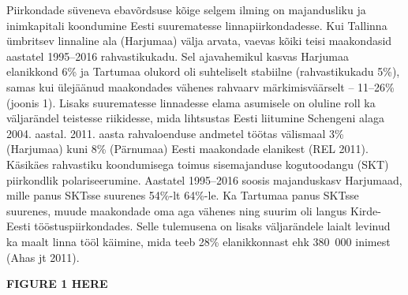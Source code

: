 \documentclass[]{book}
\begin{document}
Piirkondade süveneva ebavõrdsuse kõige selgem ilming on majandusliku ja inimkapitali koondumine Eesti
suurematesse linnapiirkondadesse. Kui Tallinna ümbritsev linnaline ala (Harjumaa) välja arvata, vaevas kõiki
teisi maakondasid aastatel 1995--2016 rahvastikukadu. Sel ajavahemikul kasvas Harjumaa elanikkond 6\% ja
Tartumaa olukord oli suhteliselt stabiilne (rahvastikukadu 5\%), samas kui ülejäänud maakondades vähenes
rahvaarv märkimisväärselt -- 11--26\% (joonis 1). Lisaks suurematesse linnadesse elama asumisele on oluline
roll ka väljarändel teistesse riikidesse, mida lihtsustas Eesti liitumine Schengeni alaga 2004. aastal. 2011.
aasta rahvaloenduse andmetel töötas välismaal 3\% (Harjumaa) kuni 8\% (Pärnumaa) Eesti maakondade
elanikest (REL 2011). Käsikäes rahvastiku koondumisega toimus sisemajanduse kogutoodangu (SKT)
piirkondlik polariseerumine. Aastatel 1995--2016 soosis majanduskasv Harjumaad, mille panus SKTsse
suurenes 54\%-lt 64\%-le. Ka Tartumaa panus SKTsse suurenes, muude maakondade oma aga vähenes ning
suurim oli langus Kirde-Eesti tööstuspiirkondades. Selle tulemusena on lisaks väljarändele laialt levinud ka
maalt linna tööl käimine, mida teeb 28\% elanikkonnast ehk 380~000 inimest (Ahas jt 2011).

\textbf{FIGURE 1 HERE}
\end{document}
